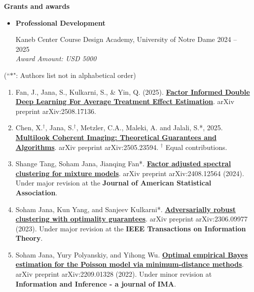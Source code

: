 \documentclass[letterpaper,12pt,oneside]{article}
\theoremstyle{definition}
\begin{document}
			\noindent \textbf{Grants and awards}
			
			\begin{itemize}
				\item[]  \textbf{Professional Development}
				
				Kaneb Center Course Design Academy, University of Notre Dame \hfill
				2024 -- 2025\\
				{\it Award Amount: USD 5000}
			\end{itemize}
			
			
			 (``$\ast$": Authors list not in alphabetical order)
			
			\begin{enumerate}
				
				\item Fan, J., Jana, S., Kulkarni, S., \& Yin, Q. (2025). \href{https://janasoham.github.io/files/fiddle.pdf}{\bf Factor Informed Double Deep Learning For Average Treatment Effect Estimation}. arXiv preprint arXiv:2508.17136.
				
				\item Chen, X.$^\dagger$, Jana, S.$^\dagger$, Metzler, C.A., Maleki, A. and Jalali, S.*, 2025. \href{https://arxiv.org/abs/2505.23594}{\bf Multilook Coherent Imaging: Theoretical Guarantees and Algorithms}. arXiv preprint arXiv:2505.23594. $^\dagger$ Equal contributions.
				
				\item Shange Tang, Soham Jana, Jianqing Fan*. \href{https://www.arxiv.org/abs/2408.12564}{\bf Factor adjusted spectral clustering for mixture models}. arXiv preprint arXiv:2408.12564 (2024). Under major revision at the {\bf Journal of American Statistical Association}.
				
				
				\item Soham Jana, Kun Yang, and Sanjeev Kulkarni*. \href{https://arxiv.org/abs/2306.09977}{\bf Adversarially robust clustering with optimality guarantees}. arXiv preprint arXiv:2306.09977 (2023). Under major revision at the {\bf IEEE Transactions on Information Theory}.
				
				\item Soham Jana, Yury Polyanskiy, and Yihong Wu. \href{https://arxiv.org/abs/2209.01328}{\bf Optimal empirical Bayes estimation for the Poisson model via minimum-distance methods}. arXiv preprint arXiv:2209.01328 (2022). Under minor revision at \textbf{Information and Inference - a journal of IMA}.
				
				
			\end{enumerate}
			
\end{document}
